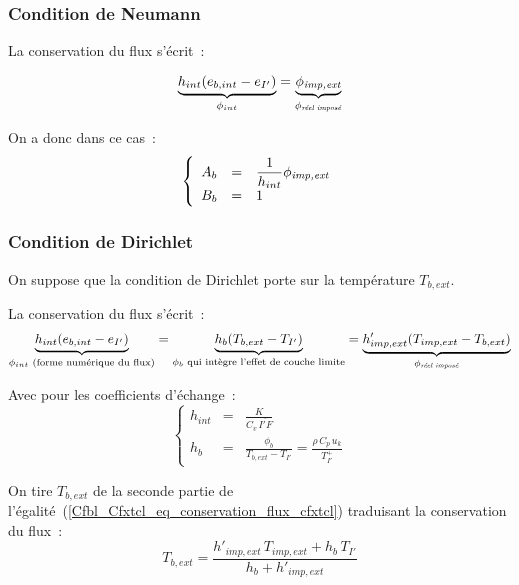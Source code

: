 \subsubsection*{Condition de Neumann}

La conservation du flux s'écrit~:

\begin{equation}
    \underbrace{h_{int}(e_{b,int}-e_{I'})}_{\phi_{int}}
    =\underbrace{\phi_{\text{\it imp,ext}}}_{\phi_{\text{\it réel imposé}}}
\end{equation}

On a donc dans ce cas~:
\begin{equation}
\left\{\begin{array}{lll}
  A_b &= &\displaystyle\frac{1}{h_{int}}\phi_{\text{\it imp,ext}}\\
  B_b &= &1
\end{array}\right.
\end{equation}


\subsubsection*{Condition de Dirichlet}

On suppose que la condition de Dirichlet porte sur la température $T_{b,ext}$.


La conservation du flux s'écrit~:
\begin{equation}\label{Cfbl_Cfxtcl_eq_conservation_flux_cfxtcl}
    \underbrace{h_{int}(e_{b,int}-e_{I'})}_{\phi_{int}\text{\ (forme numérique
du flux)}}
  = \underbrace{h_{b}(T_{b,ext}-T_{I'})}_{\phi_{b}\text{ qui intègre l'effet
de couche limite}}
  =
    \underbrace{h'_{imp,ext}(T_{imp,ext}-T_{b,ext})}_{\phi_{\text{\it réel
imposé}}}
\end{equation}

Avec pour les coefficients d'échange~:
\begin{equation}
\left\{\begin{array}{lll}
h_{int}&=&\displaystyle\frac{K}{C_v\,\overline{I'F}}\\
h_b&=&\displaystyle\frac{\phi_b}{T_{b,ext}-T_{I'}}=\frac{\rho\,C_p\,u_k}{T^+_{I'}}
\end{array}\right.
\end{equation}

On tire $T_{b,ext}$
de la seconde partie de l'égalité~(\ref{Cfbl_Cfxtcl_eq_conservation_flux_cfxtcl})
traduisant la conservation du flux~:
\begin{equation}
\displaystyle T_{b,ext} = \frac{h'_{imp,ext}\,T_{imp,ext}+h_b\,T_{I'}}{h_b+h'_{imp,ext}}
\end{equation}

